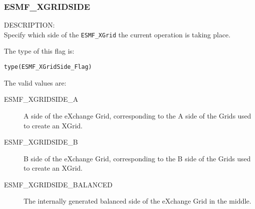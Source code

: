 
\subsubsection{ESMF\_XGRIDSIDE}
\label{const:xgridside}

{\sf DESCRIPTION:\\}  
Specify which side of the {\tt ESMF\_XGrid} the current operation is taking place.

The type of this flag is:

{\tt type(ESMF\_XGridSide\_Flag)}

The valid values are:
\begin{description}
\item [ESMF\_XGRIDSIDE\_A]
  A side of the eXchange Grid, corresponding to the A side of the Grids used to create an XGrid.
\item [ESMF\_XGRIDSIDE\_B]
  B side of the eXchange Grid, corresponding to the B side of the Grids used to create an XGrid.
\item [ESMF\_XGRIDSIDE\_BALANCED]
  The internally generated balanced side of the eXchange Grid in the middle.
\end{description}
